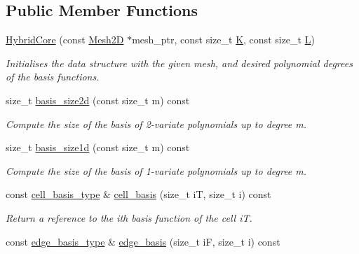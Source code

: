 \subsection*{Public Member Functions}
\begin{DoxyCompactItemize}
\item 
\hyperlink{classHCore2D_1_1HybridCore_a77e1aad579b2b484f068790d546a8d77}{Hybrid\+Core} (const \hyperlink{classHCore2D_1_1Mesh2D}{Mesh2D} $\ast$mesh\+\_\+ptr, const size\+\_\+t \hyperlink{classHCore2D_1_1HybridCore_a74242d0a8b68fe5d9a35c6eb0effe3b2}{K}, const size\+\_\+t \hyperlink{classHCore2D_1_1HybridCore_af5aea2e23e91c582d8c8189a5bc7ae96}{L})
\begin{DoxyCompactList}\small\item\em Initialises the data structure with the given mesh, and desired polynomial degrees of the basis functions. \end{DoxyCompactList}\item 
size\+\_\+t \hyperlink{classHCore2D_1_1HybridCore_a09aabd37f36e11bbcfffbb5bb59e54d2}{basis\+\_\+size2d} (const size\+\_\+t m) const
\begin{DoxyCompactList}\small\item\em Compute the size of the basis of 2-\/variate polynomials up to degree m. \end{DoxyCompactList}\item 
size\+\_\+t \hyperlink{classHCore2D_1_1HybridCore_a9b648f5564d57e4c8cfcb277abfe8adf}{basis\+\_\+size1d} (const size\+\_\+t m) const
\begin{DoxyCompactList}\small\item\em Compute the size of the basis of 1-\/variate polynomials up to degree m. \end{DoxyCompactList}\item 
const \hyperlink{classHCore2D_1_1HybridCore_a0111ea462b9a3b9859e1582b4bdaf63f}{cell\+\_\+basis\+\_\+type} \& \hyperlink{classHCore2D_1_1HybridCore_a34242db07cc2b3c3b867d9e4580b634d}{cell\+\_\+basis} (size\+\_\+t iT, size\+\_\+t i) const
\begin{DoxyCompactList}\small\item\em Return a reference to the i\textquotesingle{}th basis function of the cell iT. \end{DoxyCompactList}\item 
const \hyperlink{classHCore2D_1_1HybridCore_ad3bb126480b53a54fa7eebbcbaa1dd4c}{edge\+\_\+basis\+\_\+type} \& \hyperlink{classHCore2D_1_1HybridCore_a6b4feaeef7739a2e30fcf6c601fcf721}{edge\+\_\+basis} (size\+\_\+t iF, size\+\_\+t i) const

\end{DoxyCompactItemize}
